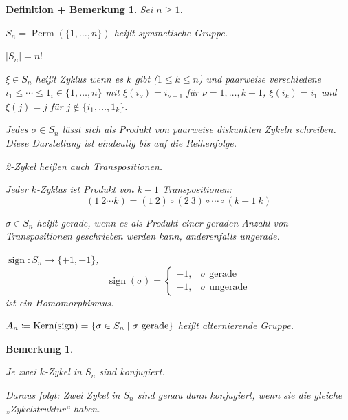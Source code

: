 \documentclass[a4paper,10pt,german]{scrbook}
\newcommand{\da}{\coloneqq}
\theoremstyle{saetze}
\theoremstyle{definitionen}
\newtheorem{DefBem}[Def]{Definition + Bemerkung}
\newtheorem{Bem}[Def]{Bemerkung}
\begin{document}
\begin{DefBem}
Sei $n\ge 1$.
\begin{enum}[a)]
\item $S_n = \operatorname{Perm}(\{1,\ldots,n\})$ heißt \textit{symmetische Gruppe}.
\item $|S_n| = n!$
\item $\xi \in S_n$ heißt Zyklus wenn es $k$ gibt ($1\le k\le n$) und paarweise verschiedene $i_1\le\cdots\le1_i\in\{1,\ldots,n\}$ mit $\xi(i_\nu) = i_{\nu+1}$ für $\nu=1,\ldots,k-1$, $\xi(i_k) = i_1$ und $\xi(j)=j$ für $j\notin \{i_1,\ldots,1_k\}$.
\item Jedes $\sigma\in S_n$ lässt sich als Produkt von paarweise diskunkten Zykeln schreiben. Diese Darstellung ist eindeutig bis auf die Reihenfolge.
\item 2-Zykel heißen auch Transpositionen.
\item Jeder $k$-Zyklus ist Produkt von $k-1$ Transpositionen:
\[
(1\ 2 \cdots k) = (1\ 2)\circ(2\ 3)\circ\cdots\circ(k-1\ k)
\]
\item $\sigma \in S_n$ heißt \textit{gerade}, wenn es als Produkt einer geraden Anzahl von Transpositionen geschrieben werden kann, anderenfalls \textit{ungerade}.
\item $\operatorname{sign} : S_n \to \{+1,-1\}$,\[\operatorname{sign}(\sigma) = \begin{cases}+1, &\sigma\text{ gerade}\\-1,&\sigma\text{ ungerade}\end{cases}\] ist ein Homomorphismus.

$A_n\da \Kern(\operatorname{sign}) = \{\sigma \in S_n\mid \sigma \text{ gerade}\}$ heißt \textit{alternierende Gruppe}.
\end{enum}
\end{DefBem}

\begin{Bem}
\begin{enum}
\item
Je zwei $k$-Zykel in $S_n$ sind konjugiert.
\item Daraus folgt: Zwei Zykel in $S_n$ sind genau dann konjugiert, wenn sie die gleiche „Zykelstruktur“ haben.
\end{enum}
\end{Bem}
\end{document}

